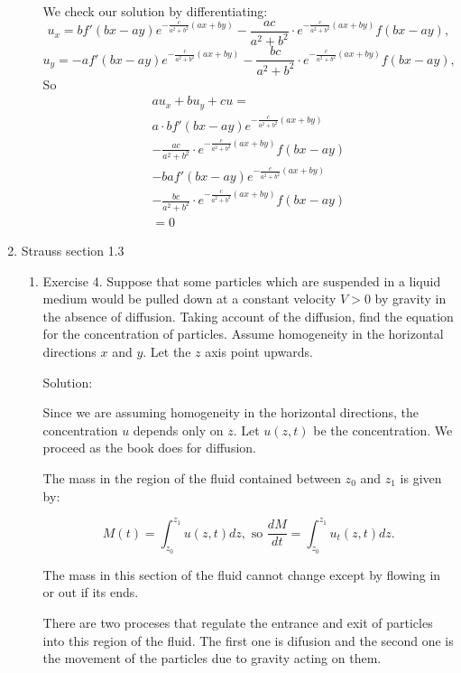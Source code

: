 \documentclass{article}
\begin{document}
\begin{enumerate}
\begin{enumerate}
		We check our solution by differentiating:
		\[u_x= b f'(bx-ay)e^{-\frac{c}{a^2+b^2}(ax+by)} -\frac{ac}{a^2+b^2} \cdot e^{-\frac{c}{a^2+b^2}(ax+by)}f(bx-ay),\]
		\[u_y= -a f'(bx-ay)e^{-\frac{c}{a^2+b^2}(ax+by)} -\frac{bc}{a^2+b^2} \cdot e^{-\frac{c}{a^2+b^2}(ax+by)}f(bx-ay),\]
		So
		\begin{align*}
			au_x+bu_y+cu= \\
			a\cdot b f'(bx-ay)e^{-\frac{c}{a^2+b^2}(ax+by)} \\
			-\frac{ac}{a^2+b^2} \cdot e^{-\frac{c}{a^2+b^2}(ax+by)}f(bx-ay) \\
			-b a f'(bx-ay)e^{-\frac{c}{a^2+b^2}(ax+by)} \\
			-\frac{bc}{a^2+b^2} \cdot e^{-\frac{c}{a^2+b^2}(ax+by)}f(bx-ay) \\
			= 0
		\end{align*}
	\end{enumerate}
\item Strauss section 1.3
	\begin{enumerate}
		\item Exercise 4. Suppose that some particles which are
			suspended in a liquid medium would be pulled down
			at a constant velocity $V > 0$ by gravity in the
			absence of diffusion. Taking account of the
			diffusion, find the equation for the concentration
			of particles. Assume homogeneity in the horizontal
			directions $x$ and $y$. Let the $z$ axis point
			upwards.

			Solution:


			Since we are assuming homogeneity in the horizontal
			directions, the concentration $u$ depends only on $z$.
			Let $u(z,t)$ be the concentration. We proceed as the
			book does for diffusion.

			The mass in the region of the fluid contained between
			$z_0$ and $z_1$ is given by:

			\begin{equation} \label{change_of_mass}
				M(t) = \int_{z_0}^{z_1} u(z,t)dz, \text{ so }
			\frac{dM}{dt}=\int_{z_0}^{z_1}u_t(z,t)dz.
			\end{equation}

			The mass in this section of the fluid cannot change
			except by flowing in or out if its ends.

			There are two proceses that regulate the entrance and
			exit of particles into this region of the fluid.
			The first one is difusion and the second one is the
			movement of the particles due to gravity acting on
			them.


\end{enumerate}
\end{enumerate}
\end{document}
